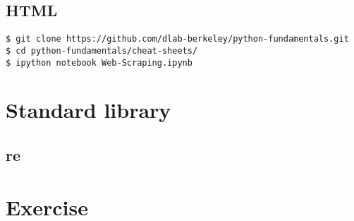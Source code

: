 \subsection{HTML}


\begin{verbatim}
$ git clone https://github.com/dlab-berkeley/python-fundamentals.git
$ cd python-fundamentals/cheat-sheets/
$ ipython notebook Web-Scraping.ipynb
\end{verbatim}



\section{Standard library}

\subsection{re}

\section{Exercise}



